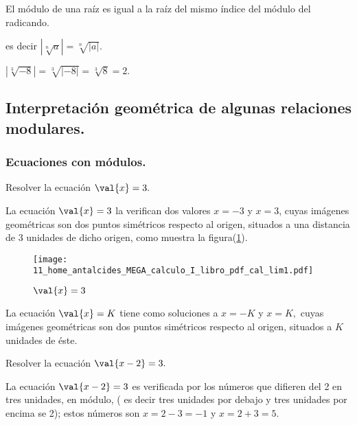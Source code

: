 \begin{propiedad}{}

El módulo de una raíz es igual a la raíz del mismo índice del módulo
del radicando. 

\end{propiedad}

es decir $\left|\sqrt[n]{a}\right|=\sqrt[n]{\left|a\right|}$.

\begin{ejemplo}

$\left|\sqrt[3]{-8}\right|=\sqrt[3]{\left|-8\right|}=\sqrt[3]{8}=2.$

\end{ejemplo}

\subsection{Interpretación geométrica de algunas relaciones modulares.\label{subsec:Interpretaci=0000F3n-geom=0000E9trica-de}}

\subsubsection{Ecuaciones con módulos.}

\begin{ejemplo}

Resolver la ecuación $\val{x}=3.$ 

\end{ejemplo}

\sol La ecuación $\val{x}=3$ la verifican dos valores $x=-3$ y
$x=3$, cuyas imágenes geométricas son dos puntos simétricos respecto
al origen, situados a una distancia de 3 unidades de dicho origen,
como muestra la figura(\ref{fig:cal_lim1})\fin .
\begin{figure}[H]
\centering\texttt{[image: 11\_home\_antalcides\_MEGA\_calculo\_I\_libro\_pdf\_cal\_lim1.pdf]}\caption{$\val{x}=3$}\label{fig:cal_lim1}
\end{figure}
\fin

\general La ecuación $\val{x}=K$ tiene como soluciones a $x=-K$
y $x=K,$ cuyas imágenes geométricas son dos puntos simétricos respecto
al origen, situados a $K$ unidades de éste.

\begin{ejemplo}

Resolver la ecuación $\val{x-2}=3.$ 

\end{ejemplo}

\sol La ecuación $\val{x-2}=3$ es verificada por los números que
difieren del 2 en tres unidades, en módulo, ( es decir tres unidades
por debajo y tres unidades por encima se 2); estos números son $x=2-3=-1$
y $x=2+3=5.$

